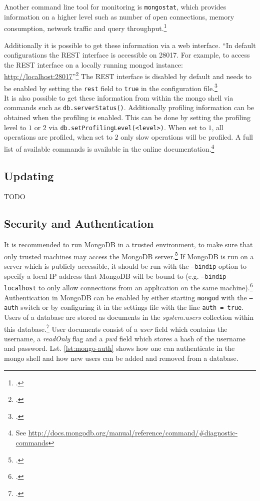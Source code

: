 Another command line tool for monitoring is \texttt{mongostat}, which provides
information on a higher level such as number of open connections,
memory consumption, network traffic and query throughput.\footcite[Cf.][]{mongo_monitoring}

Additionally it is possible to get these information via a web interface.
``In default configurations the REST interface is accessible on 28017. For
example, to access the REST interface on a locally running mongod instance:
\url{http://localhost:28017}''\footcite[][]{mongo_monitoring}
The REST interface is disabled by default and needs to be enabled by setting the
\texttt{rest} field to \texttt{true} in the configuration file.\footcite[Cf.][]{mongo_conf}\\
It is also possible to get these information from within the mongo shell via commands such as
\texttt{db.serverStatus()}. Additionally profiling information can be obtained when the
profiling is enabled. This can be done by setting the profiling level to $1$ or $2$ via
\texttt{db.setProfilingLevel(<level>)}. When set to $1$, all operations are profiled, when set
to $2$ only slow operations will be profiled.
A full list of available commands is available in the online
documentation.\footnote{See \url{http://docs.mongodb.org/manual/reference/command/\#diagnostic-commands}}

\subsection{Updating}
\label{sec:maintenance-updating}
TODO

\subsection{Security and Authentication}
\label{sec:maintenance-security}
It is recommended to run MongoDB in a trusted environment, to make sure that
only trusted machines may access the MongoDB
server.\footcite[Cf.][118]{Chodorow_2010}
If MongoDB is run on a server which is publicly accessible, it should be
run with the \texttt{--bindip} option to specify a local IP address that MongoDB
will be bound to (e.g. \texttt{--bindip localhost} to only allow
connections from an application on the same
machine).\footcite[Cf.][118]{Chodorow_2010}
Authentication in MongoDB can be enabled by either starting \texttt{mongod} with the \texttt{--auth} switch or by configuring it in the settings file with the line \texttt{auth = true}.
Users of a database are stored as documents in the \textit{system.users} collection
within this database.\footcite[Cf.][TODO]{mongo_authentication}
User documents consist of a \textit{user} field which contains the username,
a \textit{readOnly} flag and a \textit{pwd} field which stores a hash of the
username and password. Lst. \ref{lst:mongo-auth} shows how one can
authenticate in the mongo shell and how new users can be added and removed from
a database.

